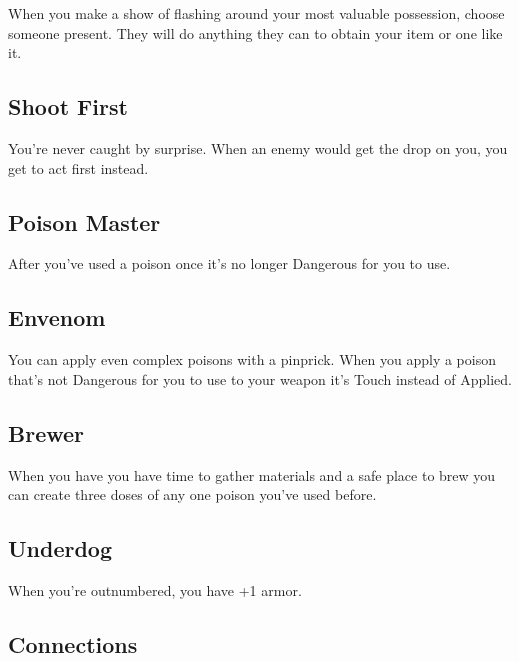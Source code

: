 When you make a show of flashing around your most valuable possession, choose someone present. They will do anything they can to obtain your item or one like it.

         
\subsection{Shoot First}   
         

You're never caught by surprise. When an enemy would get the drop on you, you get to act first instead.

         
\subsection{Poison Master}    
         

After you've used a poison once it's no longer Dangerous for you to use.

         
\subsection{Envenom}   
         

You can apply even complex poisons with a pinprick. When you apply a poison that's not Dangerous for you to use to your weapon it's Touch instead of Applied.

         
\subsection{Brewer}   
         

When you have you have time to gather materials and a safe place to brew you can create three doses of any one poison you've used before.

         
\subsection{Underdog}   
         

When you're outnumbered, you have +1 armor.

         
\subsection{Connections}   
         

